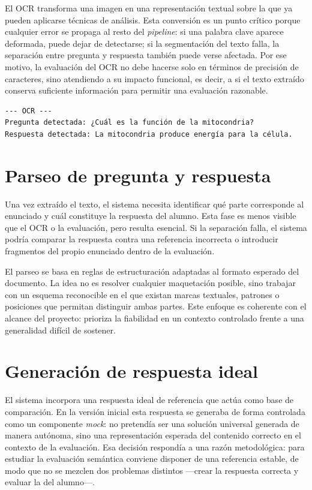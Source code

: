 El OCR transforma una imagen en una representación textual sobre la que ya pueden aplicarse técnicas de análisis. Esta conversión es un punto crítico porque cualquier error se propaga al resto del \emph{pipeline}: si una palabra clave aparece deformada, puede dejar de detectarse; si la segmentación del texto falla, la separación entre pregunta y respuesta también puede verse afectada. Por ese motivo, la evaluación del OCR no debe hacerse solo en términos de precisión de caracteres, sino atendiendo a su impacto funcional, es decir, a si el texto extraído conserva suficiente información para permitir una evaluación razonable.

\begin{lstlisting}[style=terminal]
--- OCR ---
Pregunta detectada: ¿Cuál es la función de la mitocondria?
Respuesta detectada: La mitocondria produce energía para la célula.
\end{lstlisting}

\section{Parseo de pregunta y respuesta}

Una vez extraído el texto, el sistema necesita identificar qué parte corresponde al enunciado y cuál constituye la respuesta del alumno. Esta fase es menos visible que el OCR o la evaluación, pero resulta esencial. Si la separación falla, el sistema podría comparar la respuesta contra una referencia incorrecta o introducir fragmentos del propio enunciado dentro de la evaluación.

El parseo se basa en reglas de estructuración adaptadas al formato esperado del documento. La idea no es resolver cualquier maquetación posible, sino trabajar con un esquema reconocible en el que existan marcas textuales, patrones o posiciones que permitan distinguir ambas partes. Este enfoque es coherente con el alcance del proyecto: prioriza la fiabilidad en un contexto controlado frente a una generalidad difícil de sostener.

\section{Generación de respuesta ideal}

El sistema incorpora una respuesta ideal de referencia que actúa como base de comparación. En la versión inicial esta respuesta se generaba de forma controlada como un componente \emph{mock}: no pretendía ser una solución universal generada de manera autónoma, sino una representación esperada del contenido correcto en el contexto de la evaluación. Esa decisión respondía a una razón metodológica: para estudiar la evaluación semántica conviene disponer de una referencia estable, de modo que no se mezclen dos problemas distintos —crear la respuesta correcta y evaluar la del alumno—.

